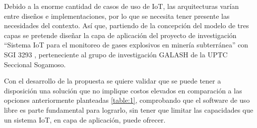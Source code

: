 \documentclass[stu,12pt,floatsintext]{apa7}
\begin{document}
		
		
		 Debido a la enorme cantidad de casos de uso de IoT, las arquitecturas varían entre diseños e implementaciones, por lo que se necesita tener presente las necesidades del contexto. Así que, partiendo de la concepción del modelo de tres capas\cite{10.1007/978-981-16-5655-2_3} se pretende diseñar la capa de aplicación del proyecto de investigación ``Sistema IoT para el monitoreo de gases explosivos en minería subterránea'' con SGI 3293 , perteneciente al grupo de investigación GALASH de la UPTC Seccional Sogamoso.
		
		Con el desarrollo de la propuesta se quiere validar que se puede tener a disposición una solución que no implique costos elevados en comparación a las opciones anteriormente planteadas \ref{table:1}, comprobando que el software de uso libre es parte fundamental para lograrlo, sin tener que limitar las capacidades que un sistema IoT, en capa de aplicación, puede ofrecer.
	
\end{document}
